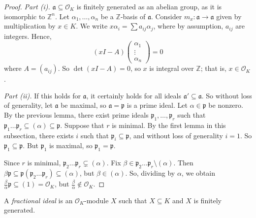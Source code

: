 \begin{proof}
    \emph{Part (i).}
    \( \mathfrak a \subseteq \mathcal O_K \) is finitely generated as an abelian group, as it is isomorphic to \( \mathbb Z^n \).
    Let \( \alpha_1, \dots, \alpha_n \) be a \( \mathbb Z \)-basis of \( \mathfrak a \).
    Consider \( m_x \colon \mathfrak a \to \mathfrak a \) given by multiplication by \( x \in K \).
    We write \( x \alpha_i = \sum a_{ij} \alpha_j \), where by assumption, \( a_{ij} \) are integers.
    Hence,
    \[ (xI - A) \begin{pmatrix}
        \alpha_1 \\
        \vdots \\
        \alpha_n
    \end{pmatrix} = 0 \]
    where \( A = (a_{ij}) \).
    So \( \det(xI - A) = 0 \), so \( x \) is integral over \( \mathbb Z \); that is, \( x \in \mathcal O_K \).

    \emph{Part (ii).}
    If this holds for \( \mathfrak a \), it certainly holds for all ideals \( \mathfrak a' \subseteq \mathfrak a \).
    So without loss of generality, let \( \mathfrak a \) be maximal, so \( \mathfrak a = \mathfrak p \) is a prime ideal.
    Let \( \alpha \in \mathfrak p \) be nonzero.
    By the previous lemma, there exist prime ideals \( \mathfrak p_1, \dots, \mathfrak p_r \) such that \( \mathfrak p_1 \dots \mathfrak p_r \subseteq (\alpha) \subseteq \mathfrak p \).
    Suppose that \( r \) is minimal.
    By the first lemma in this subsection, there exists \( i \) such that \( \mathfrak p_i \subseteq \mathfrak p \), and without loss of generality \( i = 1 \).
    So \( \mathfrak p_1 \subseteq \mathfrak p \).
    But \( \mathfrak p_1 \) is maximal, so \( \mathfrak p_1 = \mathfrak p \).

    Since \( r \) is minimal, \( \mathfrak p_2 \dots \mathfrak p_r \subsetneq (\alpha) \).
    Fix \( \beta \in \mathfrak p_2 \dots \mathfrak p_r \setminus (\alpha) \).
    Then \( \beta \mathfrak p \subseteq \mathfrak p (\mathfrak p_2 \dots \mathfrak p_r) \subseteq (\alpha) \), but \( \beta \in (\alpha) \).
    So, dividing by \( \alpha \), we obtain \( \frac{\beta}{\alpha} \mathfrak p \subseteq (1) = \mathcal O_K \), but \( \frac{\beta}{\alpha} \not\in \mathcal O_K \).
\end{proof}
\begin{definition}
    A \emph{fractional ideal} is an \( \mathcal O_K \)-module \( X \) such that \( X \subseteq K \) and \( X \) is finitely generated.
\end{definition}
